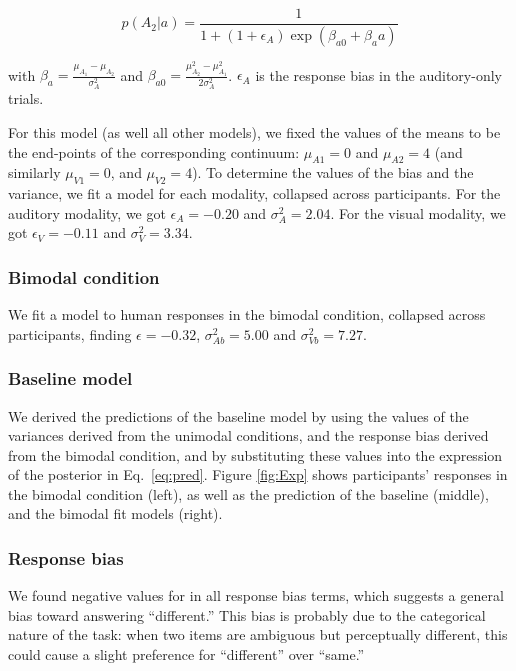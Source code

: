 \documentclass[10pt,letterpaper]{article}
\begin{document}
\begin{equation}
p(A_2 | a)=\frac{1}{1+(1+\epsilon_A)\exp(\beta_{a0}+\beta_aa)}
\end{equation}

with $\beta_a=\frac{\mu_{A_1}-\mu_{A_2}}{\sigma^2_{A}}$ and  $\beta_{a0}=\frac{\mu^2_{A_2}-\mu^2_{A_1}}{2\sigma^2_{A}}$. $\epsilon_A$ is the response bias in the auditory-only trials.

For this model (as well all other models), we fixed the values of the means to be the end-points of the corresponding continuum: $\mu_{A1}=0$ and $\mu_{A2}=4$ (and similarly $\mu_{V1}=0$, and $\mu_{V2}=4$). To determine the values of the bias and the variance, we fit a model for each modality, collapsed across participants. For the auditory modality, we got $\epsilon_A=-0.20$ and $\sigma^2_A=2.04$. For the visual modality, we got $\epsilon_V=-0.11$ and $\sigma^2_V=3.34$.

\subsubsection{Bimodal condition}

We fit a model to human responses in the bimodal condition, collapsed across participants, finding $\epsilon=-0.32$, $\sigma^2_{Ab}=5.00$ and $\sigma^2_{Vb}=7.27$.

\subsubsection{Baseline model}

We derived the predictions of the baseline model by using the values of the variances derived from the unimodal conditions, and the response bias derived from the bimodal condition, and by substituting these values into the expression of the posterior in Eq.~\ref{eq:pred}. Figure \ref{fig:Exp} shows participants' responses in the bimodal condition (left), as well as the prediction of the baseline (middle), and the bimodal fit models (right).

\subsubsection{Response bias}

We found negative values for in all response bias terms, which suggests a general bias toward answering ``different.''  This bias is probably due to the categorical nature of the task: when two items are ambiguous but perceptually different, this could cause a slight preference for ``different'' over ``same.''
\end{document}
